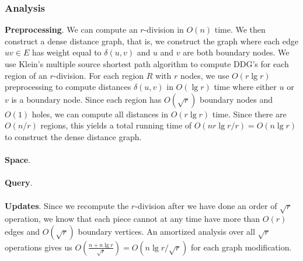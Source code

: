\subsubsection{Analysis}
\textbf{Preprocessing}.
We can compute an $r$-division in $O(n)$
time. We then
construct a dense distance graph, that is, we construct the graph where each edge $uv\in
E$ has weight equal to $\delta(u,v)$ and $u$ and $v$ are both boundary nodes. We use
Klein's multiple source shortest path algorithm \cite{klein2005multiple} to compute DDG's
for each region of an $r$-division. For each region $R$ with $r$ nodes, we use $O(r\lg
r)$ preprocessing to compute distances $\delta(u,v)$ in $O(\lg r)$ time where either $u$
or $v$ is a boundary node. Since each region has $O(\sqrt{r})$ boundary nodes and $O(1)$
holes, we can compute all distances in $O(r\lg r)$ time. Since there are $O(n/r)$
regions, this yields a total running time of $O(nr\lg r/r)=O(n\lg r)$ to construct the
dense distance graph. \\
\\
\textbf{Space}. \\
\\
\textbf{Query}. \\
\\
\textbf{Updates}.
 Since we recompute the $r$-division after we have
done an order of $\sqrt{r}$ operation, we know that each piece cannot at any time have
more than $O(r)$ edges and $O(\sqrt{r})$ boundary vertices. An amortized analysis over
all $\sqrt{r}$ operations gives us $O(\frac{n+n\lg r}{\sqrt{r}})=O(n\lg r/\sqrt{r})$ for
each graph modification.


